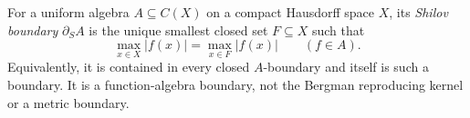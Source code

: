
For a uniform algebra $A\subseteq C(X)$ on a compact Hausdorff space $X$, its \emph{Shilov boundary} $\partial_S A$ is the unique smallest closed set $F\subseteq X$ such that
\[
\max_{x\in X}|f(x)|=\max_{x\in F}|f(x)|\qquad(f\in A).
\]
Equivalently, it is contained in every closed $A$-boundary and itself is such a boundary. It is a function-algebra boundary, not the Bergman reproducing kernel or a metric boundary.
